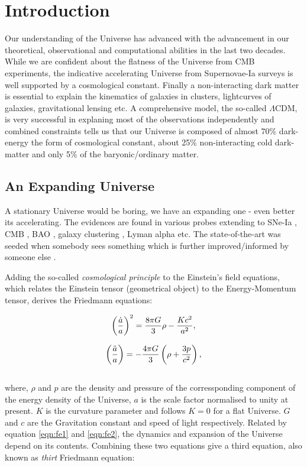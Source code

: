 \chapter{Introduction}\label{Introduction}

Our understanding of the Universe has advanced with the advancement in our 
theoretical, observational and computational abilities in the last two decades. 
While we are confident about the flatness of the Universe from CMB experiments, 
the indicative accelerating Universe from Supernovae-Ia surveys is well supported
by a cosmological constant. Finally a non-interacting dark matter is essential 
to explain the kinematics of galaxies in clusters, lightcurves of galaxies, 
gravitational lensing etc. A comprehensive model, the so-called $\Lambda$CDM,
is very successful in explaning most of the observations independently and 
combined constraints tells us that our Universe is composed of almost 70$\%$
dark-energy the form of cosmological constant, about 25$\%$ non-interacting
cold dark-matter and only 5$\%$ of the baryonic/ordinary matter. 


\section{An Expanding Universe}

A stationary Universe would be boring, we have an expanding one - even better its
accelerating. The evidences are found in various probes extending to SNe-Ia \cite{}, 
CMB \cite{}, BAO \cite{}, galaxy clustering \cite{}, Lyman alpha \cite{} etc. 
The state-of-the-art was seeded when somebody sees something \cite{} which is 
further improved/informed by someone else \cite{}.

Adding the so-called {\it cosmological principle} to the Einstein's field equations, 
which relates the Einstein tensor (geometrical object) to the Energy-Momentum tensor, 
derives the Friedmann equations:

\begin{equation}
\centering
\left( \dfrac{\dot{a}}{a} \right)^2 = \dfrac{8 \pi G}{3} \rho - \dfrac{Kc^2}{a^2},
\label{eqn:fe1}
\end{equation}

\begin{equation}
\centering
\left( \dfrac{\ddot{a}}{a} \right) = -\dfrac{4 \pi G}{3} \left( \rho + \dfrac{3p}{c^2} \right),
\label{eqn:fe2}
\end{equation}
\\
where, $\rho$ and $p$ are the density and pressure of the corressponding component of
the energy density of the Universe, $a$ is the scale factor normalised to unity at present.
$K$ is the curvature parameter and follows $K=0$ for a flat Universe. $G$ and $c$ are
the Gravitation constant and speed of light respectively. Related by equation \ref{eqn:fe1} 
and \ref{eqn:fe2}, the dynamics and expansion of the Universe depend on its contents. 
Combining these two equations give a third equation, also known as {\it thirt} Friedmann
equation:

